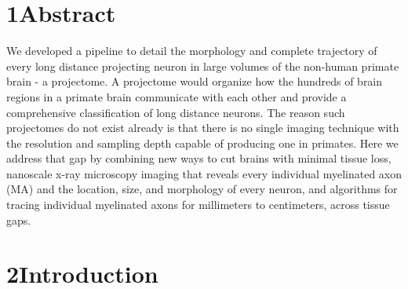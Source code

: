 \documentclass{article}
\begin{document}
\section*{1\quad Abstract}

We developed a pipeline to detail the morphology and complete trajectory of every long distance projecting neuron in large volumes of the non-human primate brain - a projectome. A projectome would organize how the hundreds of brain regions in a primate brain communicate with each other and provide a comprehensive classification of long distance neurons. The reason such projectomes do not exist already is that there is no single imaging technique with the resolution and sampling depth capable of producing one in primates. Here we address that gap by combining new ways to cut brains with minimal tissue loss, nanoscale x-ray microscopy imaging that reveals every individual myelinated axon (MA) and the location, size, and morphology of every neuron, and algorithms for tracing individual myelinated axons for millimeters to centimeters, across tissue gaps.

\section*{2\quad Introduction}
\end{document}
